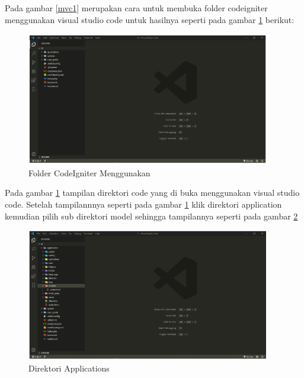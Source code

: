 Pada gambar \ref{mvc1} merupakan cara untuk membuka folder codeigniter menggunakan visual studio code untuk hasilnya seperti pada gambar \ref{mvc2} berikut:

\begin{figure}[h]
	\centerline{\includegraphics[width=0.95\textwidth]{figures/MVC/2.png}}
	\caption{Folder CodeIgniter Menggunakan}
	\label{mvc2}
\end{figure}

Pada gambar \ref{mvc2} tampilan direktori code yang di buka menggunakan visual studio code. Setelah tampilannnya seperti pada gambar \ref{mvc2} klik direktori application kemudian pilih sub direktori model sehingga tampilannya seperti pada gambar \ref{mvc3}

\begin{figure}[h]
	\centerline{\includegraphics[width=0.95\textwidth]{figures/MVC/3.png}}
	\caption{Direktori Applications}
	\label{mvc3}
\end{figure}
\pagebreak


